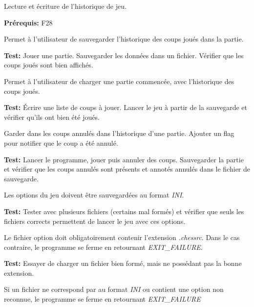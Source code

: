 \documentclass{article}
\begin{document}
\begin{nonfunctionnalneedbox}
    Lecture et écriture de l'historique de jeu.

    \textbf{Prérequis:} F28
    \begin{subneedbox}
        Permet à l'utilisateur de sauvegarder l'historique des coups joués dans la partie.

        \textbf{Test:} Jouer une partie. Sauvegarder les données dans un fichier. Vérifier
        que les coups joués sont bien affichés.
    \end{subneedbox}
    \begin{subneedbox}
        Permet à l'utilisateur de charger une partie commencée, avec l'historique des coups joués.

        \textbf{Test:} Écrire une liste de coups à jouer. Lancer le jeu à partir de la sauvegarde et
        vérifier qu'ils ont bien été joués.
    \end{subneedbox}
    \begin{subneedbox}
        Garder dans les coups annulés dans l'historique d'une partie. Ajouter un flag pour notifier que
        le coup a été annulé.

        \textbf{Test:} Lancer le programme, jouer puis annuler des coups. Sauvegarder la partie et vérifier
        que les coups annulés sont présents et annotés annulés dans le fichier de sauvegarde.
    \end{subneedbox}
\end{nonfunctionnalneedbox}

\begin{nonfunctionnalneedbox}
    \begin{subneedbox}
        Les options du jeu doivent être sauvegardées au format \textit{INI}.

        \textbf{Test:} Tester avec plusieurs fichiers (certains mal formés) et vérifier 
        que seuls les fichiers corrects permettent de lancer le jeu avec ces options.
    \end{subneedbox}
    \begin{subneedbox}
        Le fichier option doit obligatoirement contenir l'extension \textit{.chessrc}.
        Dans le cas contraire, le programme se ferme en retournant \textit{EXIT\_FAILURE}.

        \textbf{Test:} Essayer de charger un fichier bien formé, mais ne possédant
        pas la bonne extension.
    \end{subneedbox}
    \begin{subneedbox}
        Si un fichier ne correspond par au format \textit{INI} ou contient une 
        option non reconnue, le programme se ferme en retournant \textit{EXIT\_FAILURE}
    \end{subneedbox}
    
\end{nonfunctionnalneedbox}
\end{document}
